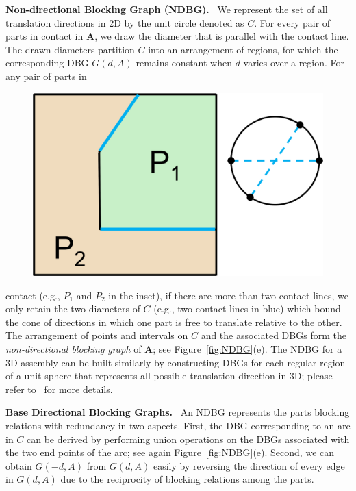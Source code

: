 \vspace*{1.0mm}
\noindent
{\bf Non-directional Blocking Graph (NDBG).} \
We represent the set of all translation directions in 2D by the unit circle denoted as $C$.
For every pair of parts in contact in $\mathbf{A}$, we draw the diameter that is parallel with the contact line.
The drawn diameters partition $C$ into an arrangement of regions, for which the corresponding DBG $G(d, A)$ remains constant when $d$ varies over a region.
For any pair of parts in 
\vspace*{5mm}
\setlength{\columnsep}{13pt}
\begin{figure}
	\vspace{-6pt}
	\centering
	\hspace{-4pt}
	\includegraphics[width=0.32\columnwidth]{images/NDBG_Diameter.png}
	\vspace{-5pt}
\end{figure}
contact (e.g., $P_1$ and $P_2$ in the inset), if there are more than two contact lines, we only retain the two diameters of $C$ (e.g., two contact lines in blue) which bound the cone of directions in which one part is free to translate relative to the other.
The arrangement of points and intervals on $C$ and the associated DBGs form the {\em non-directional blocking graph} of $\mathbf{A}$; see Figure~\ref{fig:NDBG}(e).
The NDBG for a 3D assembly can be built similarly by constructing DBGs for each regular region of a unit sphere that represents all possible translation direction in 3D; please refer to~\cite{Wilson-1994-GeometricReasoning} for more details.

\vspace*{1.0mm}
\noindent
{\bf Base Directional Blocking Graphs.} \
An NDBG represents the parts blocking relations with redundancy in two aspects.
First, the DBG corresponding to an arc in $C$ can be derived by performing union operations on the DBGs associated with the two end points of the arc; see again Figure~\ref{fig:NDBG}(e).
Second, we can obtain $G(-d, A)$ from $G(d, A)$ easily by reversing the direction of every edge in $G(d, A)$ due to the reciprocity of  blocking relations among the parts.

